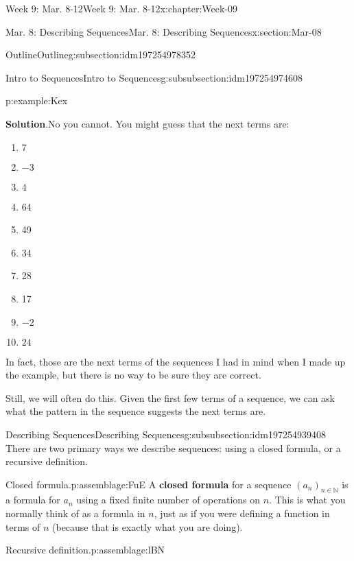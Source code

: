 \documentclass[oneside,10pt,]{book}
\newcommand{\blocktitlefont}{\relax}
\newcommand{\terminology}[1]{\textbf{#1}}
\numberwithin{equation}{section}
\def\N{{\mathbb N}}
\newcommand{\N}{\mathbb N}
\begin{document}
\begin{chapterptx}{Week 9: Mar. 8-12}{}{Week 9: Mar. 8-12}{}{}{x:chapter:Week-09}
\begin{sectionptx}{Mar. 8: Describing Sequences}{}{Mar. 8: Describing Sequences}{}{}{x:section:Mar-08}
\begin{subsectionptx}{Outline}{}{Outline}{}{}{g:subsection:idm197254978352}
\begin{subsubsectionptx}{Intro to Sequences}{}{Intro to Sequences}{}{}{g:subsubsection:idm197254974608}
\begin{example}{}{p:example:Kex}
\begin{enumerate}
\end{enumerate}
%
\par\smallskip%
\noindent\textbf{\blocktitlefont Solution}.\hypertarget{p:solution:OOq}{}\quad{}No you cannot. You might guess that the next terms are:%
\par
%
\begin{multicols}{4}
\begin{enumerate}
\item{}\(\displaystyle 7\)%
\item{}\(\displaystyle -3\)%
\item{}\(\displaystyle 4\)%
\item{}64%
\item{}49%
\item{}34%
\item{}28%
\item{}17%
\item{}\(\displaystyle -2\)%
\item{}\(\displaystyle 24\)%
\end{enumerate}
\end{multicols}
%
\par
In fact, those are the next terms of the sequences I had in mind when I made up the example, but there is no way to be sure they are correct.%
\par
Still, we will often do this. Given the first few terms of a sequence, we can ask what the pattern in the sequence suggests the next terms are.%
\end{example}
\end{subsubsectionptx}
%
%
\typeout{************************************************}
\typeout{************************************************}
%
\begin{subsubsectionptx}{Describing Sequences}{}{Describing Sequences}{}{}{g:subsubsection:idm197254939408}
There are two primary ways we describe sequences: using a closed formula, or a recursive definition.%
\begin{assemblage}{Closed formula.}{p:assemblage:FuE}%
A \terminology{closed formula}  for a sequence \((a_n)_{n\in\N}\) is a formula for \(a_n\) using a fixed finite number of operations on \(n\). This is what you normally think of as a formula in \(n\), just as if you were defining a function in terms of \(n\) (because that is exactly what you are doing).%
\end{assemblage}
\begin{assemblage}{Recursive definition.}{p:assemblage:lBN}%

\end{assemblage}
\end{subsubsectionptx}
\end{subsectionptx}
\end{sectionptx}
\end{chapterptx}
\end{document}
